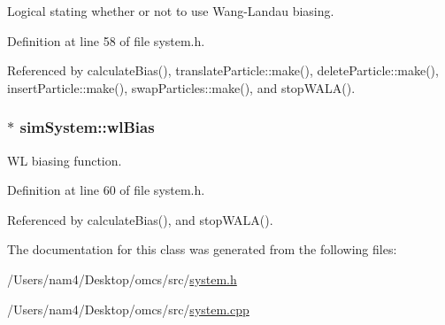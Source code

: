 Logical stating whether or not to use Wang-\/\+Landau biasing. 



Definition at line 58 of file system.\+h.



Referenced by calculate\+Bias(), translate\+Particle\+::make(), delete\+Particle\+::make(), insert\+Particle\+::make(), swap\+Particles\+::make(), and stop\+W\+A\+L\+A().

\hypertarget{classsim_system_a6dc8d9f89dfcfa247a59bc50889c49e7}{}
\subsubsection[{wl\+Bias}]{$\ast$ sim\+System\+::wl\+Bias}\label{classsim_system_a6dc8d9f89dfcfa247a59bc50889c49e7}


W\+L biasing function. 



Definition at line 60 of file system.\+h.



Referenced by calculate\+Bias(), and stop\+W\+A\+L\+A().



The documentation for this class was generated from the following files\+:\begin{DoxyCompactItemize}
\item 
/\+Users/nam4/\+Desktop/omcs/src/\hyperlink{system_8h}{system.\+h}\item 
/\+Users/nam4/\+Desktop/omcs/src/\hyperlink{system_8cpp}{system.\+cpp}\end{DoxyCompactItemize}

